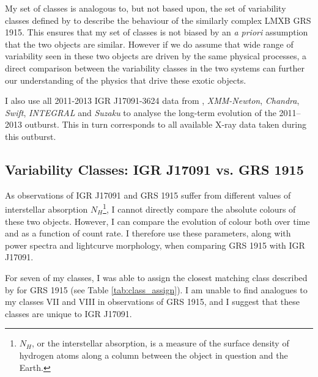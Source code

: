\par My set of classes is analogous to, but not based upon, the set of variability classes defined by \citealt{Belloni_GRS_MI} to describe the behaviour of the similarly complex LMXB GRS 1915.  This ensures that my set of classes is not biased by an \textit{a priori} assumption that the two objects are similar.  However if we do assume that wide range of variability seen in these two objects are driven by the same physical processes, a direct comparison between the variability classes in the two systems can further our understanding of the physics that drive these exotic objects.
\par I also use all 2011-2013 IGR J17091-3624 data from \rxte , \textit{XMM-Newton}, \textit{Chandra}, \textit{Swift}, \textit{INTEGRAL} and \textit{Suzaku} to analyse the long-term evolution of the 2011--2013 outburst.  This in turn corresponds to all available X-ray data taken during this outburst.

\subsection{Variability Classes: IGR J17091 vs. GRS 1915}

\par As observations of IGR J17091 and GRS 1915 suffer from different values of interstellar absorption $N_H$\footnote{$N_H$, or the interstellar absorption, is a measure of the surface density of hydrogen atoms along a column between the object in question and the Earth.}, I cannot directly compare the absolute colours of these two objects.  However, I can compare the evolution of colour both over time and as a function of count rate.  I therefore use these parameters, along with power spectra and lightcurve morphology, when comparing GRS 1915 with IGR J17091.
\par For seven of my classes, I was able to assign the closest matching class described by \citealt{Belloni_GRS_MI} for GRS 1915 (see Table \ref{tab:class_assign}).  I am unable to find analogues to my classes VII and VIII in observations of GRS 1915, and I suggest that these classes are unique to IGR J17091.

